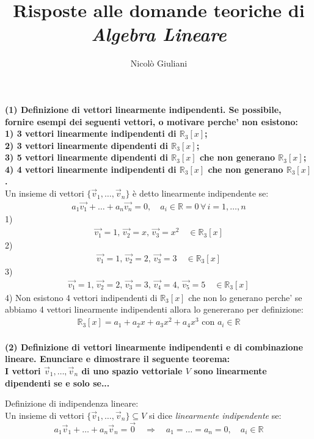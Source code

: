 \documentclass[10pt]{extarticle}
\title{Risposte alle domande teoriche di \textit{Algebra Lineare}}
\author{Nicolò Giuliani}
\date{}
\begin{document}
\maketitle
\textbf{
(1) Definizione di vettori linearmente indipendenti. Se possibile, fornire esempi dei seguenti
vettori, o motivare perche' non esistono: \\
1) 3 vettori linearmente indipendenti di $\mathbb{R}_3[x]$; \\
2) 3 vettori linearmente dipendenti di $\mathbb{R}_3[x]$; \\
3) 5 vettori linearmente dipendenti di $\mathbb{R}_3[x]$ che non generano $\mathbb{R}_3[x]$; \\
4) 4 vettori linearmente indipendenti di $\mathbb{R}_3[x]$ che non generano $\mathbb{R}_3[x]$.} \\
Un insieme di vettori $\{\vec{v}_1, \dots, \vec{v}_n\}$ è detto linearmente indipendente se:
\begin{align*}
    a_1\vec{v_1}+\dots+a_n\vec{v_n}=0, \quad a_i \in \mathbb{R} =0 \, \forall \, i=1,\dots,n 
\end{align*}
1)
\begin{align*}
    \vec{v_1}=1, \, \vec{v_2}=x, \, \vec{v_3}=x^2 \quad \in \mathbb{R}_3[x]
\end{align*}
2) 
\begin{align*}
    \vec{v_1}=1, \, \vec{v_2}=2, \, \vec{v_3}=3 \quad \in \mathbb{R}_3[x]
\end{align*}
3) 
\begin{align*}
    \vec{v_1}=1, \, \vec{v_2}=2, \, \vec{v_3}=3, \, \vec{v_4}=4, \, \vec{v_5}=5  \quad \in \mathbb{R}_3[x]
\end{align*}
4) Non esistono 4 vettori indipendenti di $\mathbb{R}_3[x]$ che non lo generano perche' se abbiamo 4 vettori linearmente indipendenti allora lo genererano per definizione:
\begin{align*}
    \mathbb{R}_3[x]=a_1+a_2x+a_3x^2+a_4x^3 \text{ con } a_i \in \mathbb{R}
\end{align*}
\vspace{1em} \\
\textbf{(2) Definizione di vettori linearmente indipendenti e di combinazione lineare. Enunciare e dimostrare il seguente teorema: \\
I vettori $\vec{v}_1,\dots,\vec{v}_n$ di uno spazio vettoriale $V$ sono linearmente dipendenti se e solo se...}

Definizione di indipendenza lineare: \\
Un insieme di vettori $\{\vec{v}_1, \dots, \vec{v}_n\} \subseteq V$ si dice \emph{linearmente indipendente} se:
\[
a_1 \vec{v}_1 + \dots + a_n \vec{v}_n = \vec{0} \quad \Rightarrow \quad a_1 = \dots = a_n = 0, \quad a_i \in \mathbb{R}
\]
\end{document}
